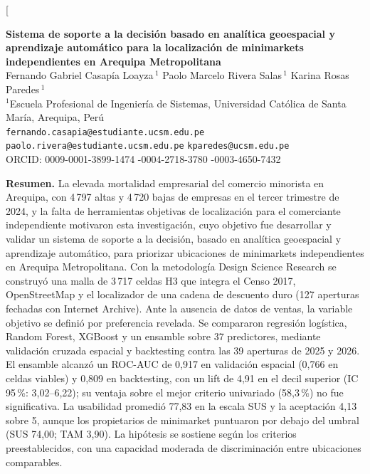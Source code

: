 \documentclass[10pt,letterpaper,twocolumn]{article}
\begin{document}
\twocolumn[{%

\begin{center}
{\LARGE\bfseries Sistema de soporte a la decisión basado en analítica geoespacial y aprendizaje automático para la localización de minimarkets independientes en Arequipa Metropolitana}\\[1.1em]
{\large Fernando Gabriel Casapía Loayza\,$^{1}$ \quad Paolo Marcelo Rivera Salas\,$^{1}$ \quad Karina Rosas Paredes\,$^{1}$}\\[0.5em]
{\small $^{1}$Escuela Profesional de Ingeniería de Sistemas, Universidad Católica de Santa María, Arequipa, Perú}\\[0.3em]
{\small \texttt{fernando.casapia@estudiante.ucsm.edu.pe} \quad \texttt{paolo.rivera@estudiante.ucsm.edu.pe} \quad \texttt{kparedes@ucsm.edu.pe}}\\[0.3em]
{\footnotesize ORCID: 0009-0001-3899-1474 -0004-2718-3780 -0003-4650-7432}
\end{center}
\vspace{0.4em}
\begin{center}
\begin{minipage}{0.94\textwidth}
\small
\noindent\textbf{Resumen.}
La elevada mortalidad empresarial del comercio minorista en Arequipa, con 4\,797 altas y 4\,720 bajas de empresas en el tercer trimestre de 2024, y la falta de herramientas objetivas de localización para el comerciante independiente motivaron esta investigación, cuyo objetivo fue desarrollar y validar un sistema de soporte a la decisión, basado en analítica geoespacial y aprendizaje automático, para priorizar ubicaciones de minimarkets independientes en Arequipa Metropolitana. Con la metodología Design Science Research se construyó una malla de 3\,717 celdas H3 que integra el Censo 2017, OpenStreetMap y el localizador de una cadena de descuento duro (127 aperturas fechadas con Internet Archive). Ante la ausencia de datos de ventas, la variable objetivo se definió por preferencia revelada. Se compararon regresión logística, Random Forest, XGBoost y un ensamble sobre 37 predictores, mediante validación cruzada espacial y backtesting contra las 39 aperturas de 2025 y 2026. El ensamble alcanzó un ROC-AUC de 0,917 en validación espacial (0,766 en celdas viables) y 0,809 en backtesting, con un lift de 4,91 en el decil superior (IC 95\,\%: 3,02--6,22); su ventaja sobre el mejor criterio univariado (58,3\,\%) no fue significativa. La usabilidad promedió 77,83 en la escala SUS y la aceptación 4,13 sobre 5, aunque los propietarios de minimarket puntuaron por debajo del umbral (SUS 74,00; TAM 3,90). La hipótesis se sostiene según los criterios preestablecidos, con una capacidad moderada de discriminación entre ubicaciones comparables.


\end{minipage}
\end{center}}
\end{document}

